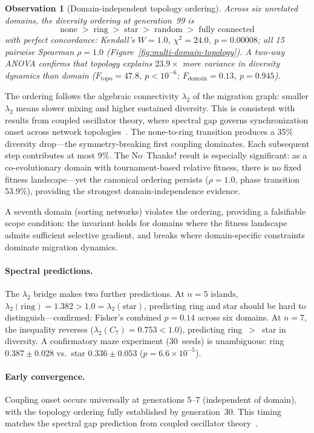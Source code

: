 \documentclass[dvipsnames,format=sigconf,anonymous=false,review=false]{acmart}
\newtheorem{observation}[theorem]{Observation}%
\begin{document}
\begin{observation}[Domain-independent topology ordering]
\label{obs:main}
Across six unrelated domains, the diversity ordering at generation~99 is
\[
\text{none} \;>\; \text{ring} \;>\; \text{star} \;>\; \text{random} \;>\; \text{fully connected}
\]
with perfect concordance: Kendall's $W = 1.0$, $\chi^2 = 24.0$, $p = 0.00008$; all 15 pairwise Spearman $\rho = 1.0$ (Figure~\ref{fig:multi-domain-topology}). A two-way ANOVA confirms that topology explains $23.9\times$ more variance in diversity dynamics than domain ($F_{\mathrm{topo}} = 47.8$, $p < 10^{-6}$; $F_{\mathrm{domain}} = 0.13$, $p = 0.945$).
\end{observation}

The ordering follows the algebraic connectivity $\lambda_2$ of the migration graph: smaller $\lambda_2$ means slower mixing and higher sustained diversity. This is consistent with results from coupled oscillator theory, where spectral gap governs synchronization onset across network topologies~\cite{sanz2026algebraic}. The none-to-ring transition produces a 35\% diversity drop---the symmetry-breaking first coupling dominates. Each subsequent step contributes at most 9\%. The No~Thanks! result is especially significant: as a co-evolutionary domain with tournament-based relative fitness, there is no fixed fitness landscape---yet the canonical ordering persists ($\rho = 1.0$, phase transition 53.9\%), providing the strongest domain-independence evidence.

A seventh domain (sorting networks) violates the ordering, providing a falsifiable scope condition: the invariant holds for domains where the fitness landscape admits sufficient selective gradient, and breaks where domain-specific constraints dominate migration dynamics.

\paragraph{Spectral predictions.}
The $\lambda_2$ bridge makes two further predictions. At $n{=}5$ islands, $\lambda_2(\text{ring}) = 1.382 > 1.0 = \lambda_2(\text{star})$, predicting ring and star should be hard to distinguish---confirmed: Fisher's combined $p = 0.14$ across six domains. At $n{=}7$, the inequality reverses ($\lambda_2(C_7) = 0.753 < 1.0$), predicting ring~$>$~star in diversity. A confirmatory maze experiment (30~seeds) is unambiguous: ring $0.387 \pm 0.028$ vs.\ star $0.336 \pm 0.053$ ($p = 6.6 \times 10^{-5}$).

\paragraph{Early convergence.}
Coupling onset occurs universally at generations 5--7 (independent of domain), with the topology ordering fully established by generation~30. This timing matches the spectral gap prediction from coupled oscillator theory~\cite{sanz2026algebraic}.
\end{document}
